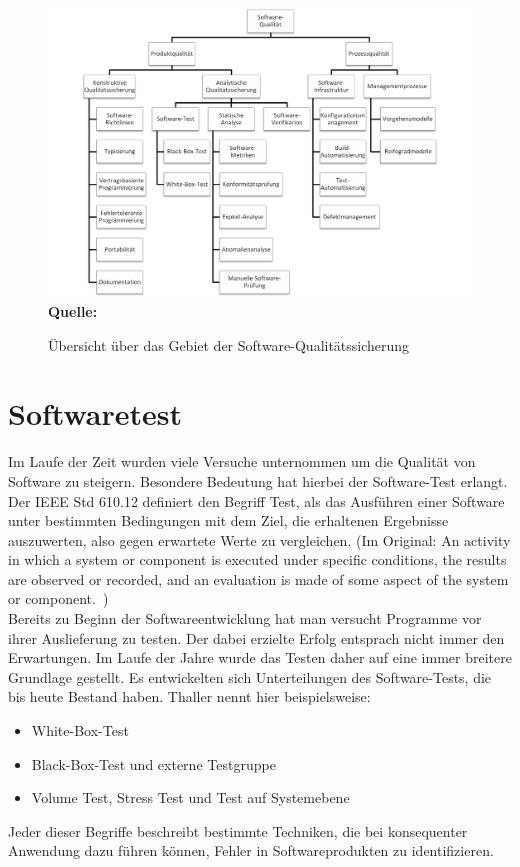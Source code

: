 \begin{figure}[htb]
  \centering  
  \includegraphics[scale=0.7]{img/softwarequalitaet.png}\\
  \footnotesize\sffamily\textbf{Quelle:} \cite[vgl. S.20]{hoffmann_software-qualitat_2013}
  \caption{Übersicht über das Gebiet der Software-Qualitätssicherung}
  \label{fig:softwareQualitätssicherung}
\end{figure}



\section{Softwaretest}
\label{sec:softwaretest}
Im Laufe der Zeit wurden viele Versuche unternommen um die Qualität von Software zu steigern. Besondere Bedeutung hat hierbei der Software-Test erlangt.
Der IEEE Std 610.12 definiert den Begriff Test, als das Ausführen einer Software unter bestimmten Bedingungen mit dem Ziel, die erhaltenen Ergebnisse auszuwerten, also gegen erwartete Werte zu vergleichen.
(Im Original: \glqq An activity in which a system or component is executed under specific conditions, the results are observed or recorded, and an evaluation is made of some aspect of the system or component.\grqq\ \cite{ieee_ieee_1991})\\
Bereits zu Beginn der Softwareentwicklung hat man versucht Programme vor ihrer Auslieferung zu testen. Der dabei erzielte Erfolg entsprach nicht immer den Erwartungen. Im Laufe der Jahre wurde das Testen daher auf eine immer breitere Grundlage gestellt. Es entwickelten sich Unterteilungen des Software-Tests, die bis heute Bestand haben. Thaller \cite[vgl. S.18]{thaller_software-test_2002} nennt hier beispielsweise:
\begin{itemize}
\item White-Box-Test
\item Black-Box-Test und externe Testgruppe
\item Volume Test, Stress Test und Test auf Systemebene
\end{itemize}
Jeder dieser Begriffe beschreibt bestimmte Techniken, die bei konsequenter Anwendung dazu führen können, Fehler in Softwareprodukten zu identifizieren. 

